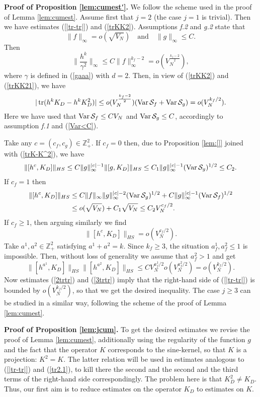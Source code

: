 \documentclass{article}
\numberwithin{equation}{section}
\newcommand{\mZ}{\mathbb{Z}}
\newcommand{\SSS}{{\cal S}}
\newcommand{\ga}{\gamma}
\newcommand{\tr}{\operatorname{tr}}
\newcommand{\Var}{\operatorname{Var}}
\newcommand{\ssk}{\smallskip}
\newcommand{\fr}{\frac}
\newcommand{\qnd}{\quad\mbox{and}\quad}
\newcommand{\lbl}{\label}
\newcommand{\rlem}{Lemma \nolinebreak}
\newcommand{\bee}{\begin{equation}}
\newcommand{\eee}{\end{equation}}
\newcommand{\non}{\nonumber}
\begin{document}
\ssk



\ssk
{\bf Proof of Proposition \ref{lem:cumest'}.}
We follow the scheme used in the proof of \rlem \ref{lem:cumest}.
Assume first that $j=2$ (the case $j=1$ is trivial).
Then we have estimates (\ref{|tr-tr|}) and (\ref{trKK2}).
Assumptions \emph{f.2} and \emph{g.2}  state that
\bee\lbl{fginfty}
\|f\|_\infty = o(\sqrt{V_N})
\qnd
\|g\|_\infty \leq C.
\eee
Then
$$
\Big\|\fr{h^k}{\ga^2}\Big\|_\infty
\leq C\|f\|_\infty^{k_f-2}
= o(V_N^{\fr{k_f-2}{2}}),
$$
where $\ga$ is defined in (\ref{gaaa}) with $d=2$.
Then, in view of (\ref{trKK2}) and (\ref{trKK21}),
we have
\bee\lbl{2trtr}
|\tr(h^kK_D -h^kK_D^2)|\leq
o(V_N^{\fr{k_f-2}{2}})(\Var\SSS_{f}+\Var\SSS_g)
= o(V_N^{k_f/2}).
\eee
Here we have used that
$\Var\SSS_{f}\leq CV_N$
and
$\Var\SSS_{g}\leq C$,
accordingly to assumption \emph{f.1} and (\ref{Var<C}).

Take any $c=(c_f,c_g)\in\mZ^{2}_+.$
If $c_f=0$ then,
due to Proposition \ref{lem:[]} joined with (\ref{trK-K^2}),
we have
\begin{align}\lbl{bf=0}
\|[h^c,K_D]\|_{HS}\leq
C\|g\|^{|c|-1}_\infty
\|[g,K_D]\|_{HS}
\leq
C_1\|g\|^{|c|-1}_\infty
(\Var\SSS_{g})^{1/2}\leq C_2.
\end{align}
If $c_f=1$ then
\begin{align}\lbl{bf=1}
\|[h^c,K_D]\|_{HS}&\leq
C\|f\|_\infty\|g\|^{|c|-2}_\infty
(\Var\SSS_{g})^{1/2}
+
C\|g\|^{|c|-1}_\infty
(\Var\SSS_{f})^{1/2}
\\\non
&\leq
o(\sqrt{V_N}) + C_1\sqrt{V_N}\leq C_2 V_N^{c_f/2}.
\end{align}
If $c_f\geq 1$, then arguing similarly we find
\bee\lbl{bf>1}
\|[h^c,K_D]\|_{HS}
=
o(V_N^{c_f/2}).
\eee
Take $a^1,a^2\in\mZ^2_+$ satisfying $a^1+a^2=k$.
Since $k_f\geq 3$,
the situation $a^1_f,a^2_f\leq 1$ is impossible.
Then, without loss of generality we assume that $a^2_f>1$ and get
\bee\lbl{3trtr}
\|[h^{a^1},K_D]\|_{HS}\|[h^{a^2},K_D]\|_{HS}
\leq CV_N^{a^1_f/2} o(V_N^{a^2_f/2})
= o(V_N^{k_f/2}).
\eee
Now estimates (\ref{2trtr}) and (\ref{3trtr}) imply that
the right-hand side of (\ref{|tr-tr|}) is bounded by $o(V_N^{k_f/2})$,
so that we get the desired inequality.
The case $j\geq 3$ can be studied in a similar way,
following the scheme of the proof of \rlem \ref{lem:cumest}.


\ssk
{\bf Proof of Proposition \ref{lem:jcum}.}
To get the desired estimates we revise the proof of \rlem \ref{lem:cumest},
additionally using the regularity of the function $g$
and the fact that the operator $K$ corresponds to the sine-kernel,
so that $K$ is a projection: $K^2=K$.
The latter relation will be used in estimates
analogous to (\ref{|tr-tr|}) and (\ref{tr2.1}),
to kill there the second and the second and the third terms
of the right-hand side correspondingly.
The problem here is that $K^2_D\neq K_D$.
Thus, our first aim is to reduce estimates on the operator $K_D$ to estimates on $K$.
\end{document}
